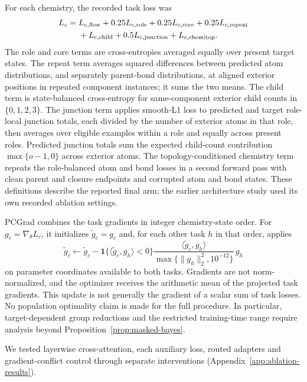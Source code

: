 \documentclass{article}
\theoremstyle{definition}
\begin{document}
For each chemistry, the recorded task loss was
\begin{equation}
\begin{aligned}
 L_c={}&L_{c,\rm flow}
 +0.25L_{c,\rm role}+0.25L_{c,\rm core}+0.25L_{c,\rm repeat}\\
 &+L_{c,\rm child}+0.5L_{c,\rm junction}+L_{c,\rm chem\mid top}.
\end{aligned}
\label{eq:production-task-loss}
\end{equation}
The role and core terms are cross-entropies averaged equally over present target states.
The repeat term averages squared differences between predicted atom distributions, and separately
parent-bond distributions, at aligned exterior positions in repeated component instances; it sums
the two means. The child term is state-balanced cross-entropy for same-component exterior child
counts in $\{0,1,2,3\}$. The junction term applies smooth-L1 loss to predicted and target
role-local junction totals, each divided by the number of exterior atoms in that role, then averages
over eligible examples within a role and equally across present roles. Predicted junction totals
sum the expected child-count contribution $\max\{o-1,0\}$ across exterior atoms.
The topology-conditioned chemistry term repeats the role-balanced atom and bond losses in a second
forward pass with clean parent and closure endpoints and corrupted atom and bond states.
These definitions describe the reported final arm; the earlier architecture study used its own
recorded ablation settings.

PCGrad combines the task gradients in integer chemistry-state order. For
$g_c=\nabla_\theta L_c$, it initializes $\widetilde g_c=g_c$ and, for each other task $h$ in that
order, applies
\begin{equation}
 \widetilde g_c\leftarrow\widetilde g_c-
 \mathbf1\{\langle\widetilde g_c,g_h\rangle<0\}
 \frac{\langle\widetilde g_c,g_h\rangle}{\max\{\|g_h\|_2^2,10^{-12}\}}\,g_h
\end{equation}
on parameter coordinates available to both tasks. Gradients are not norm-normalized, and the
optimizer receives the arithmetic mean of the projected task gradients. This update is not generally
the gradient of a scalar sum of task losses. No population optimality claim is made for the full
procedure. In particular, target-dependent group reductions and the restricted training-time range
require analysis beyond Proposition~\ref{prop:masked-bayes}.

We tested layerwise cross-attention, each auxiliary loss, routed adapters and gradient-conflict
control through separate interventions (Appendix~\ref{app:ablation-results}).
\end{document}
